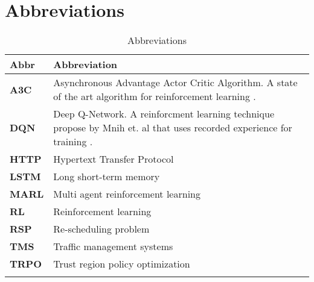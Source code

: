 \section{Abbreviations}\label{section:abkuerzungsverzeichnis}


\begin{longtable}{|m{3cm}|m{11cm}|}\hline	
	\rowcolor{gray} \textbf{Abbr}&
	Abbreviation \\ \hline

	\textbf{A3C}&
	Asynchronous Advantage Actor Critic Algorithm. A state of the art algorithm for reinforcement learning \cite{a3c}.\\ \hline

	\textbf{DQN}&
	Deep Q-Network. A reinforcment learning technique propose by Mnih et. al that uses recorded experience for training \cite{mnih2013playing}.\\ \hline

	\textbf{HTTP}&
	Hypertext Transfer Protocol \\ \hline

	\textbf{LSTM}&
	Long short-term memory \\ \hline

	\textbf{MARL}&
	Multi agent reinforcement learning \\ \hline

	\textbf{RL}&
	Reinforcement learning \\ \hline

	\textbf{RSP}&
	Re-scheduling problem \\ \hline

	\textbf{TMS}&
	Traffic management systems \\ \hline

	\textbf{TRPO}&
	Trust region policy optimization \\ \hline

\caption{Abbreviations}
\label{tab:abkuerzungsverzeichnis}
\end{longtable}
